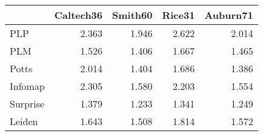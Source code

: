 \begin{tabular}{lrrrr}
\toprule
{} & Caltech36 & Smith60 & Rice31 & Auburn71 \\
\midrule
PLP      &     2.363 &   1.946 &  2.622 &    2.014 \\
PLM      &     1.526 &   1.406 &  1.667 &    1.465 \\
Potts    &     2.014 &   1.404 &  1.686 &    1.386 \\
Infomap  &     2.305 &   1.580 &  2.203 &    1.554 \\
Surprise &     1.379 &   1.233 &  1.341 &    1.249 \\
Leiden   &     1.643 &   1.508 &  1.814 &    1.572 \\
\bottomrule
\end{tabular}
